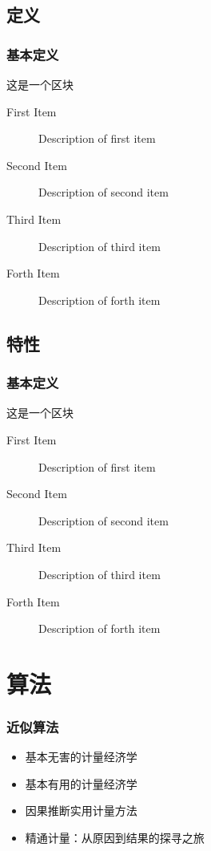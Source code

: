 \documentclass[11pt,c,compress,UTF8]{ctexbeamer}
\begin{document}
\subsection{定义}
\begin{frame} 
\frametitle{基本定义}
\begin{block}{}
        这是一个区块
\end{block}
\begin{description}
\item[First Item] Description of first item
\item[Second Item] Description of second item
\item[Third Item] Description of third item
\item[Forth Item] Description of forth item
\end{description}
\end{frame}

\subsection{特性}
\begin{frame} 
\frametitle{基本定义}
\begin{block}{}
        这是一个区块
\end{block}
\begin{description}
\item[First Item] Description of first item
\item[Second Item] Description of second item
\item[Third Item] Description of third item
\item[Forth Item] Description of forth item
\end{description}
\end{frame}

\section{算法}

\begin{frame} 
\frametitle{近似算法} 
\begin{itemize} 
 \item 基本无害的计量经济学
 \item 基本有用的计量经济学 
 \item 因果推断实用计量方法
 \item 精通计量：从原因到结果的探寻之旅 
\end{itemize} 
\end{frame}
\end{document}
